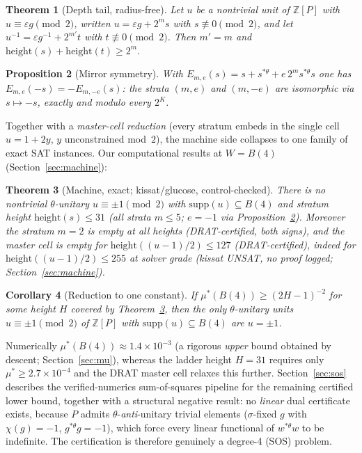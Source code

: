 \documentclass[10pt,a4paper]{amsart}
\newtheorem{theorem}{Theorem}[section]
\newtheorem{proposition}[theorem]{Proposition}
\newtheorem{corollary}[theorem]{Corollary}
\newcommand{\ZZ}{\mathbb{Z}}
\newcommand{\thst}{{*\theta}}
\newcommand{\hgt}{\mathrm{height}}
\newcommand{\supp}{\mathrm{supp}}
\begin{document}
\begin{theorem}[Depth tail, radius-free]\label{thm:tail}
Let $u$ be a nontrivial unit of $\ZZ[P]$ with $u\equiv \varepsilon g
\pmod 2$, written $u=\varepsilon g+2^m s$ with $s\not\equiv 0 \pmod
2$, and let $u^{-1}=\varepsilon g^{-1}+2^{m'}t$ with
$t\not\equiv 0\pmod 2$.  Then $m'=m$ and $\hgt(s)+\hgt(t)\ge 2^m$.
\end{theorem}

\begin{proposition}[Mirror symmetry]\label{prop:mirror}
With $E_{m,e}(s)=s+s^{\thst}+e\,2^m s^{\thst}s$ one has
$E_{m,e}(-s)=-E_{m,-e}(s)$: the strata $(m,e)$ and $(m,-e)$ are
isomorphic via $s\mapsto -s$, exactly and modulo every $2^K$.
\end{proposition}

Together with a \emph{master-cell reduction} (every stratum embeds in
the single cell $u=1+2y$, $y$ unconstrained mod~$2$), the machine side
collapses to one family of exact SAT instances.  Our computational
results at $W=B(4)$ (Section~\ref{sec:machine}):

\begin{theorem}[Machine, exact; kissat/glucose, control-checked]
\label{thm:ladder}
There is no nontrivial $\theta$-unitary $u\equiv\pm1\pmod 2$ with
$\supp(u)\subseteq B(4)$ and stratum height $\hgt(s)\le 31$
(all strata $m\le 5$; $e=-1$ via Proposition~\ref{prop:mirror}).
Moreover the stratum $m=2$ is empty at \emph{all} heights
(DRAT-certified, both signs), and the master cell is empty for
$\hgt((u-1)/2)\le 127$ (DRAT-certified), indeed for
$\hgt((u-1)/2)\le 255$ at solver grade (kissat UNSAT, no proof
logged; Section~\ref{sec:machine}).
\end{theorem}

\begin{corollary}[Reduction to one constant]\label{cor:onecst}
If $\mu^*(B(4))\ge (2H-1)^{-2}$ for some height $H$ covered by
Theorem~\ref{thm:ladder}, then the only $\theta$-unitary units
$u\equiv\pm1\pmod 2$ of $\ZZ[P]$ with $\supp(u)\subseteq B(4)$ are
$u=\pm1$.
\end{corollary}

Numerically $\mu^*(B(4))\approx 1.4\times 10^{-3}$ (a rigorous
\emph{upper} bound obtained by descent; Section~\ref{sec:mu}), whereas
the ladder height $H=31$ requires only $\mu^*\ge 2.7\times10^{-4}$ and
the DRAT master cell relaxes this further.  Section~\ref{sec:sos}
describes the verified-numerics sum-of-squares pipeline for the
remaining certified lower bound, together with a structural negative
result: no \emph{linear} dual certificate exists, because $P$ admits
$\theta$-\emph{anti}-unitary trivial elements ($\sigma$-fixed $g$ with
$\chi(g)=-1$, $g^{\thst}g=-1$), which force every linear functional of
$w^{\thst}w$ to be indefinite.  The certification is therefore
genuinely a degree-4 (SOS) problem.
\end{document}
